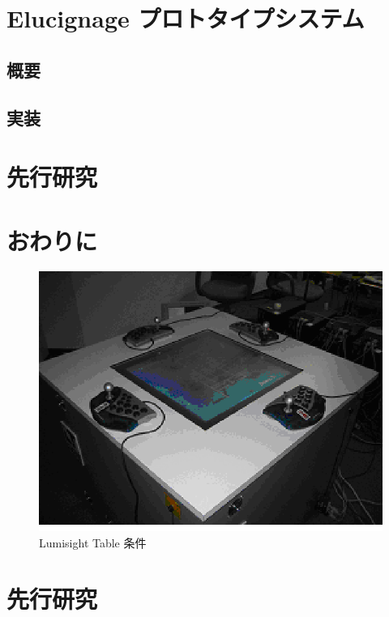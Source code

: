 \documentclass{matsushita-zemi}
\begin{document}
\section{Elucignage プロトタイプシステム}
\subsection{概要}

\subsection{実装}

\section{先行研究}
\label{relatedworks} 

\section{おわりに}

\begin{figure}[b]
 \centering
 \includegraphics[width=0.4\columnwidth]{LTCond.eps}
 \caption{Lumisight Table 条件}
 \label{LTCond}
\end{figure}

\section{先行研究}
\label{relatedworks} 
\end{document}
